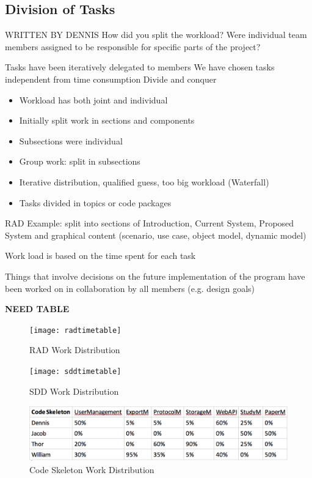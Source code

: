 \subsection{Division of Tasks}
WRITTEN BY DENNIS 
How did you split the workload? Were individual team members assigned to be responsible for specific parts of the project?

Tasks have been iteratively delegated to members 
We have chosen tasks independent from time consumption
Divide and conquer 
\begin{itemize}
	\item Workload has both joint and individual 
	\item Initially split work in sections and components 
	\item Subsections were individual 
	\item Group work: split in subsections 
	\item Iterative distribution, qualified guess, too big workload (Waterfall) 
	\item Tasks divided in topics or code packages 
\end{itemize}

RAD Example: split into sections of Introduction, Current System, Proposed System and graphical content (scenario, use case, object model, dynamic model)

Work load is based on the time spent for each task 

Things that involve decisions on the future implementation of the program have been worked on in collaboration by all members (e.g. design goals)


\textbf{NEED TABLE}

\begin{figure}[H]
	\texttt{[image: radtimetable]}
	\caption{RAD Work Distribution}
	\label{fig:rad}
\end{figure}

\begin{figure}[H]
	\texttt{[image: sddtimetable]}
	\caption{SDD Work Distribution}
	\label{fig:sdd}
\end{figure}

\begin{figure}[H]
	\includegraphics{image/skeletontimetable}
	\caption{Code Skeleton Work Distribution}
	\label{fig:codeskeleton} %
\end{figure}
